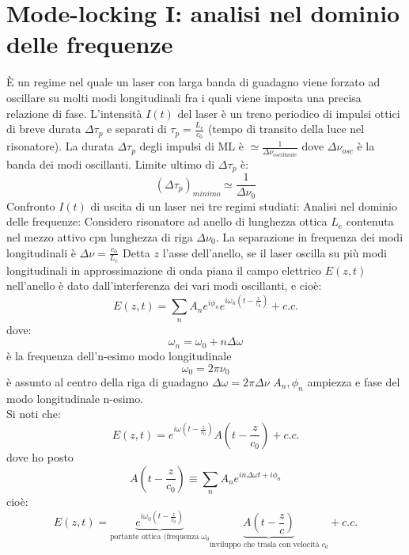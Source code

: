 \documentclass{book}
\def \w {\omega}
\def \D {\Delta}
\theoremstyle{remark}
\begin{document}
\chapter{Mode-locking I: analisi nel dominio delle frequenze}
È un regime nel quale un laser con larga banda di guadagno viene forzato ad oscillare su molti modi longitudinali fra i quali viene imposta una precisa relazione di fase. L'intensità $I(t)$ del laser è un treno periodico di impulsi ottici di breve durata $\D\tau_p$ e separati di $\tau_p = \frac{L_e}{c_0}$ (tempo di transito della luce nel risonatore). La durata $\D\tau_p$ degli impulsi di ML è $\simeq \frac{1}{\D\nu_{oscillante}}$ dove $\D\nu_{osc}$ è la banda dei modi oscillanti. Limite ultimo di $\D\tau_p$ è:
\begin{equation*}
(\D\tau_p)_{minimo} \simeq \frac{1}{\D\nu_0}
\end{equation*}
Confronto $I(t)$ di uscita di un laser nei tre regimi studiati:
Analisi nel dominio delle frequenze:
Considero risonatore ad anello di lunghezza ottica $L_e$ contenuta nel mezzo attivo cpn lunghezza di riga $\D\nu_0$. La separazione in frequenza dei modi longitudinali è $\D\nu = \frac{c_0}{L_e}$
Detta $z$ l'asse dell'anello, se il laser oscilla su più modi longitudinali in approssimazione di onda piana il campo elettrico $E(z,t)$ nell'anello è dato dall'interferenza dei vari modi oscillanti, e cioè:
\begin{equation*}
E(z,t) = \sum_n A_n e^{i\phi_n} e^{i\omega_n (t-\frac{z}{c_0})} + c.c.
\end{equation*}
dove:
\begin{equation*}
\omega_n = \omega_0 + n \D\w
\end{equation*}
è la frequenza dell'n-esimo modo longitudinale
\begin{equation*}
\omega_0 = 2\pi \nu_0
\end{equation*}
è assunto al centro della riga di guadagno $\D\omega = 2\pi\D\nu$
$A_n, \phi_n$ ampiezza e fase del modo longitudinale n-esimo.\\
Si noti che:
\begin{equation*}
E(z,t) = e^{i\omega \left(t-\frac{z}{c_0}\right)} A\left(t - \frac{z}{c_0}\right) + c.c.
\end{equation*}
dove ho posto
\begin{equation*}
A\left(t - \frac{z}{c_0}\right) \equiv \sum_n A_n e^{in\D\omega t + i\phi_n}
\end{equation*}
cioè:
\begin{equation*}
E(z,t) = \underbrace{e^{i\omega_0\left(t-\frac{z}{c_0}\right)}}_\text{portante ottica (frequenza $\omega_0$} \underbrace{A{\left(t - \frac{z}{c}\right)}}_\text{inviluppo che trasla con velocità $c_0$} + c.c.
\end{equation*}
\end{document}
